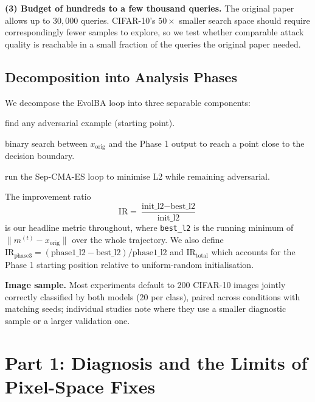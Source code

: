 \documentclass[11pt, a4paper]{article}
\begin{document}
\textbf{(3) Budget of hundreds to a few thousand queries.} The original paper allows up to $30{,}000$ queries. CIFAR-10's $50\times$ smaller search space should require correspondingly fewer samples to explore, so we test whether comparable attack quality is reachable in a small fraction of the queries the original paper needed.

\subsection{Decomposition into Analysis Phases}
\label{sec:decomposition}

We decompose the EvolBA loop into three separable components:

\begin{description}[noitemsep]
  \item[Phase 1 (Initialisation):] find any adversarial example (starting point).
  \item[Phase 2 (Boundary refinement):] binary search between $x_{\mathrm{orig}}$ and the Phase 1 output to reach a point close to the decision boundary.
  \item[Phase 3 (ES optimisation):] run the Sep-CMA-ES loop to minimise L2 while remaining adversarial.
\end{description}

The improvement ratio
\[
  \mathrm{IR} = \frac{\text{init\_l2} - \text{best\_l2}}{\text{init\_l2}}
\]
is our headline metric throughout, where \texttt{best\_l2} is the running minimum of $\|m^{(t)}-x_{\mathrm{orig}}\|$ over the whole trajectory. We also define $\mathrm{IR}_\text{phase3} = (\text{phase1\_l2}-\text{best\_l2})/\text{phase1\_l2}$ and $\mathrm{IR}_\text{total}$ which accounts for the Phase 1 starting position relative to uniform-random initialisation.

\textbf{Image sample.} Most experiments default to 200 CIFAR-10 images jointly correctly classified by both models (20 per class), paired across conditions with matching seeds; individual studies note where they use a smaller diagnostic sample or a larger validation one.

\section{Part 1: Diagnosis and the Limits of Pixel-Space Fixes}
\label{sec:diagnosis}
\end{document}
